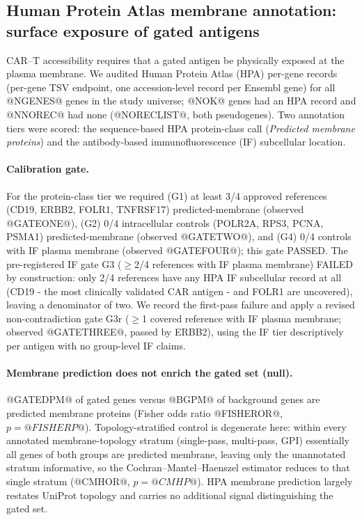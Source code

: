 \subsection{Human Protein Atlas membrane annotation: surface exposure of gated antigens}
\label{sec:hpa}
CAR--T accessibility requires that a gated antigen be physically exposed at
the plasma membrane. We audited Human Protein Atlas (HPA) per-gene records
(per-gene TSV endpoint, one accession-level record per Ensembl gene) for all
@NGENES@ genes in the study universe; @NOK@ genes had an HPA record and
@NNOREC@ had none (@NORECLIST@, both pseudogenes). Two annotation tiers were
scored: the sequence-based HPA protein-class call (\emph{Predicted membrane
proteins}) and the antibody-based immunofluorescence (IF) subcellular
location.

\paragraph{Calibration gate.} For the protein-class tier we required (G1) at
least 3/4 approved references (CD19, ERBB2, FOLR1, TNFRSF17)
predicted-membrane (observed @GATEONE@), (G2) 0/4 intracellular controls
(POLR2A, RPS3, PCNA, PSMA1) predicted-membrane (observed @GATETWO@), and
(G4) 0/4 controls with IF plasma membrane (observed @GATEFOUR@); this gate
PASSED. The pre-registered IF gate G3 ($\geq$2/4 references with IF plasma
membrane) FAILED by construction: only 2/4 references have any HPA IF
subcellular record at all (CD19 - the most clinically validated CAR antigen
- and FOLR1 are uncovered), leaving a denominator of two. We record the
first-pass failure and apply a revised non-contradiction gate G3r ($\geq$1
covered reference with IF plasma membrane; observed @GATETHREE@, passed by
ERBB2), using the IF tier descriptively per antigen with no group-level IF
claims.

\paragraph{Membrane prediction does not enrich the gated set (null).}
@GATEDPM@ of gated genes versus @BGPM@ of background genes are predicted
membrane proteins (Fisher odds ratio @FISHEROR@, $p=@FISHERP@$).
Topology-stratified control is degenerate here: within every annotated
membrane-topology stratum (single-pass, multi-pass, GPI) essentially all
genes of both groups are predicted membrane, leaving only the unannotated
stratum informative, so the Cochran--Mantel--Haenszel estimator reduces to
that single stratum (@CMHOR@, $p=@CMHP@$). HPA membrane prediction largely
restates UniProt topology and carries no additional signal distinguishing
the gated set.

